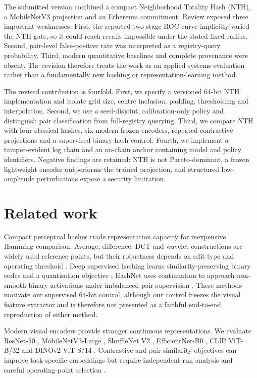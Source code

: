 \documentclass[12pt]{article}
\begin{document}
The submitted version combined a compact Neighborhood Totality Hash (NTH), a MobileNetV3 projection and an Ethereum commitment. Review exposed three important weaknesses. First, the reported two-stage ROC curve implicitly varied the NTH gate, so it could reach recalls impossible under the stated fixed radius. Second, pair-level false-positive rate was interpreted as a registry-query probability. Third, modern quantitative baselines and complete provenance were absent. The revision therefore treats the work as an applied systems evaluation rather than a fundamentally new hashing or representation-learning method.

The revised contribution is fourfold. First, we specify a versioned 64-bit NTH implementation and isolate grid size, centre inclusion, padding, thresholding and interpolation. Second, we use a seed-disjoint, calibration-only policy and distinguish pair classification from full-registry querying. Third, we compare NTH with four classical hashes, six modern frozen encoders, repeated contrastive projections and a supervised binary-hash control. Fourth, we implement a tamper-evident log chain and an on-chain anchor containing model and policy identifiers. Negative findings are retained: NTH is not Pareto-dominant, a frozen lightweight encoder outperforms the trained projection, and structured low-amplitude perturbations expose a security limitation.

\section{Related work}

Compact perceptual hashes trade representation capacity for inexpensive Hamming comparison. Average, difference, DCT and wavelet constructions are widely used reference points, but their robustness depends on edit type and operating threshold \cite{monga2006perceptual,farid2021overview}. Deep supervised hashing learns similarity-preserving binary codes and a quantisation objective \cite{liu2016dsh}; HashNet uses continuation to approach non-smooth binary activations under imbalanced pair supervision \cite{cao2017hashnet}. These methods motivate our supervised 64-bit control, although our control freezes the visual feature extractor and is therefore not presented as a faithful end-to-end reproduction of either method.

Modern visual encoders provide stronger continuous representations. We evaluate ResNet-50 \cite{he2016resnet}, MobileNetV3-Large \cite{howard2019mobilenetv3}, ShuffleNet V2 \cite{ma2018shufflenet}, EfficientNet-B0 \cite{tan2019efficientnet}, CLIP ViT-B/32 \cite{radford2021clip} and DINOv2 ViT-S/14 \cite{oquab2024dinov2}. Contrastive and pair-similarity objectives can improve task-specific embeddings but require independent-run analysis and careful operating-point selection \cite{khosla2020supcon,sun2020circle}.
\end{document}
